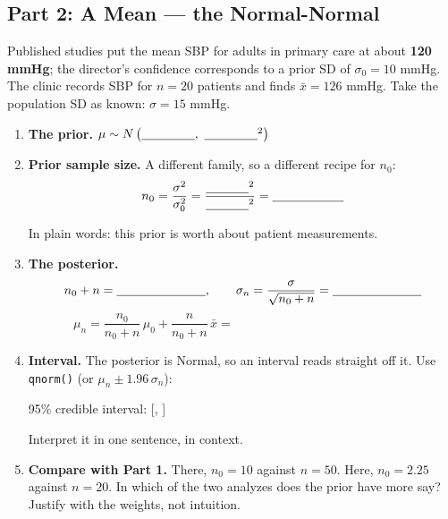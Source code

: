 \documentclass{article}
\newcommand{\blankline}[1]{\underline{\hspace{#1}}}
\begin{document}
\subsection*{Part 2: A Mean --- the Normal-Normal}

Published studies put the mean SBP for adults in primary care at about \textbf{120 mmHg}; the director's confidence corresponds to a prior SD of $\sigma_0 = 10$ mmHg. The clinic records SBP for $n = 20$ patients and finds $\bar{x} = 126$ mmHg. Take the population SD as known: $\sigma = 15$ mmHg.

\begin{enumerate}[label={\bfseries (\Alph*)},itemsep=.6em]
	\item \textbf{The prior.} \qquad $\mu \sim N\left(\blankline{1.5cm},\ \blankline{1.5cm}^2\right)$

	\item \textbf{Prior sample size.} A different family, so a different recipe for $n_0$:
	\[
	n_0 = \frac{\sigma^2}{\sigma_0^2} = \frac{\blankline{1.2cm}^2}{\blankline{1.2cm}^2} = \blankline{2cm}
	\]

	In plain words: this prior is worth about \blankline{2cm} patient measurements.

	\item \textbf{The posterior.}
	\[
	n_0 + n = \blankline{2.5cm}, \qquad \sigma_n = \frac{\sigma}{\sqrt{n_0+n}} = \blankline{2.5cm}
	\]
	\[
	\mu_n = \frac{n_0}{n_0+n}\,\mu_0 + \frac{n}{n_0+n}\,\bar{x} = \hspace{6cm}
	\]

	\item \textbf{Interval.} The posterior is Normal, so an interval reads straight off it. Use \texttt{qnorm()} (or $\mu_n \pm 1.96\,\sigma_n$):

	95\% credible interval: [\blankline{2cm}, \blankline{2cm}]

	\vspace{0.3em}
	Interpret it in one sentence, in context. \\[3em]

	\item \textbf{Compare with Part 1.} There, $n_0 = 10$ against $n = 50$. Here, $n_0 = 2.25$ against $n = 20$. In which of the two analyzes does the prior have more say? Justify with the weights, not intuition. \\[4em]

\end{enumerate}

\newpage
\end{document}
